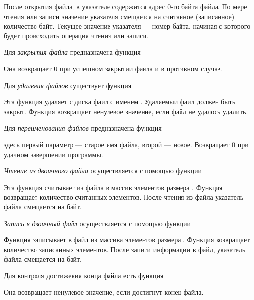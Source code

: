 После открытия файла, в указателе содержится адрес 0-го байта файла. По мере чтения или записи значение указателя
смещается на считанное (записанное) количество байт. Текущее значение указателя --- номер байта, начиная с которого будет
происходить операция чтения или записи.

Для \emph{закрытия файла} предназначена функция


Она возвращает 0 при успешном закрытии файла и  в противном случае.

Для \emph{удаления файлов} существует функция


Эта функция удаляет с диска файл с именем . Удаляемый файл должен быть закрыт. Функция
возвращает ненулевое значение, если файл не удалось удалить.

Для \emph{переименования файлов} предназначена функция


здесь первый параметр --- старое имя файла, второй --- новое. Возвращает 0 при удачном завершении программы.

\emph{Чтение из двоичного файла} осуществляется с помощью функции


Эта функция считывает из файла  в массив   
элементов размера . Функция возвращает количество считанных элементов. После чтения из файла
указатель файла смещается на  байт.

\emph{Запись в двоичный файл} осуществляется с помощью функции


Функция записывает в файл  из массива   элементов
размера . Функция возвращает количество записанных элементов. После записи информации в файл,
указатель файла смещается на  байт.

Для контроля достижения конца файла есть функция


Она возвращает ненулевое значение, если достигнут конец файла.

